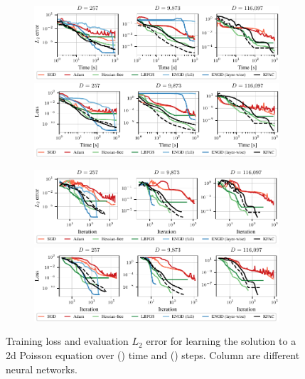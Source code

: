 \begin{figure}[!h]
  \centering
  \begin{subfigure}[t]{1.0\linewidth}
    \caption{}\label{subfig:poisson2d-time}
    \includegraphics[trim={0 1.3cm 0 0},clip]{../kfac_pinns_exp/exp17_groupplot_poisson2d/l2_error_over_time.pdf}
    \includegraphics[trim={0 0.5cm 0 0.3cm},clip]{../kfac_pinns_exp/exp17_groupplot_poisson2d/loss_over_time.pdf}
  \end{subfigure}
  \begin{subfigure}[t]{1.0\linewidth}
    \caption{}\label{subfig:poisson2d-step}
    \includegraphics[trim={0 1.3cm 0 0.3cm},clip]{../kfac_pinns_exp/exp17_groupplot_poisson2d/l2_error_over_step.pdf}
    \includegraphics[trim={0 0 0 0.3cm},clip]{../kfac_pinns_exp/exp17_groupplot_poisson2d/loss_over_step.pdf}
  \end{subfigure}
  \caption{ Training loss and evaluation $L_2$ error for learning the solution to a 2d Poisson equation over () time and () steps.
    Column are different neural networks.}\label{fig:poisson2d-appendix}
\end{figure}

